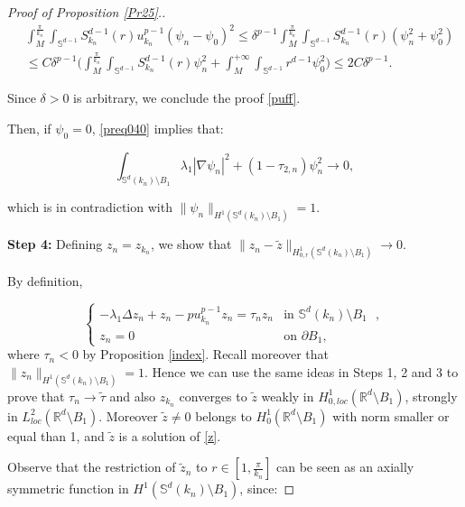 \documentclass[reqno]{amsart}
\def\R{\mathbb R}
\numberwithin{equation}{section}
\newenvironment{key words}{\textbf{Keywords}\mbox{  }}{ }
\begin{document}
\begin{proof}[Proof of Proposition \ref{Pr25}.]
\begin{align*}
	&  \int_{M}^{\frac{\pi}{k_n}} \int_{\mathbb{S}^{d-1}} S^{d-1}_{k_n}(r)  u_{k_{n}}^{p-1} (\psi_{n}- \psi_0)^2  \le \delta^{p-1}  \int_{M}^{\frac{\pi}{k_n}} \int_{\mathbb{S}^{d-1}} S^{d-1}_{k_n}(r) (\psi_{n}^2+ \psi_0^2) \\ & \le C \delta^{p-1}  \Big ( \int_{M}^{\frac{\pi}{k_n}} \int_{\mathbb{S}^{d-1}} S^{d-1}_{k_n}(r) \psi_{n}^2 + \int_{M}^{+\infty} \int_{\mathbb{S}^{d-1}} r^{d-1} \psi_{0}^2   \Big ) \le 2 C  \delta^{p-1}.
\end{align*}

Since $\delta>0$ is arbitrary, we conclude the proof \eqref{puff}.

\medskip Then, if $\psi_0=0$, \eqref{preq040} implies that:

$$ \int_{\mathbb{S}^{d}(k_{n})\setminus B_{1}} \lambda_{1} |\nabla \psi_{n}|^{2}+ (1-\tau_{2,n})\psi_{n}^{2} \to 0,$$

which is in contradiction with $\| \psi_n \|_{H^1(\mathbb{S}^d(k_n) \setminus B_1) } =1$.

\medskip

\textbf{Step 4:}  Defining $z_n= z_{k_n}$, we show that $\|z_{n}- \tilde{z}\|_{H^1_{0,r}(\mathbb{S}^{d}(k_{n})\setminus B_{1})}\rightarrow 0.$
\medskip

By definition,

\begin{equation}\label{eigen}
	\begin{cases}
		-\lambda_{1}\Delta z_{n}+z_{n}-pu_{k_{n}} ^{p-1} z_{n}= \tau_{n} z_{n}&\mbox{in $\mathbb{S}^{d}(k_{n})\setminus B_{1}$ },\\
		z_{n}=0 &\mbox{on $\partial B_1$},
	\end{cases}
\end{equation}
where $\tau_n <0$ by Proposition \ref{index}. Recall moreover that $\|z_{n}\|_{H^{1}(\mathbb{S}^{d}(k_{n})\setminus B_{1})}=1$. Hence we can use the same ideas in Steps 1, 2 and 3 to prove that $\tau_n \to \tilde{\tau}$ and also $z_{k_{n}}$ converges to $\tilde{z}$ weakly in $H_{0, loc}^1(\R^d \setminus B_1)$, strongly in $L_{loc}^2(\R^d \setminus B_1)$. Moreover $\tilde{z} \neq 0$ belongs to $H_{0}^1(\R^d \setminus B_1)$ with norm smaller or equal than 1, and $\tilde{z}$ is a solution of \eqref{z}.

Observe that the restriction of $\tilde{z}_n$ to $r \in [1, \frac{\pi}{k_n}]$ can be seen as an axially symmetric function in $H^1(\mathbb{S}^{d}(k_n) \setminus B_1)$, since:


\end{proof}
\end{document}
